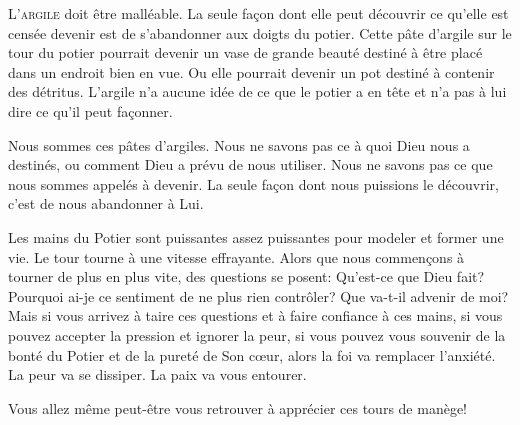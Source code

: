 



\lettrine{L}{'argile} doit être malléable.
 La seule fa\c{c}on dont elle peut découvrir ce qu'elle est censée devenir
 est de s'abandonner aux doigts du potier.
 Cette pâte d'argile sur le tour du potier pourrait devenir
 un vase de grande beauté destiné à être placé dans un endroit
 bien en vue. Ou elle pourrait devenir un pot destiné à contenir
 des détritus. L'argile n'a aucune idée de ce que le potier
 a en tête et n'a pas à lui dire ce qu'il peut fa\c{c}onner.

Nous sommes ces pâtes d'argiles.
 Nous ne savons pas ce à quoi Dieu nous a destinés,
 ou comment Dieu a prévu de nous utiliser.
 Nous ne savons pas ce que nous sommes appelés à devenir.
 La seule fa\c{c}on dont nous puissions le découvrir,
 c'est de nous abandonner à Lui.


Les mains du Potier sont puissantes \ocadr assez puissantes pour modeler
 et former une vie. Le tour tourne à une vitesse effrayante.
 Alors que nous commen\c{c}ons à tourner de plus en plus vite,
 des questions se posent: Qu'est-ce que Dieu fait?
 Pourquoi ai-je ce sentiment de ne plus rien contrôler?
 Que va-t-il advenir de moi? Mais si vous arrivez à taire ces questions
 et à faire confiance à ces mains, si vous pouvez accepter la pression
 et ignorer la peur, si vous pouvez vous souvenir de la bonté du Potier
 et de la pureté de Son c\oe{}ur, alors la foi va remplacer l'anxiété.
 La peur va se dissiper. La paix va vous entourer.

Vous allez même peut-être vous retrouver à apprécier ces tours de manège!

\dvrule



